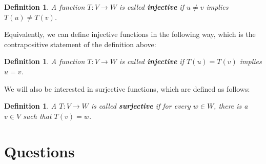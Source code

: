 \documentclass[12pt]{article}
\newtheorem{DEF}[thm]{Definition}
\begin{document}
\begin{DEF} A function $T: V \to W$ is called  \textbf{injective} if $u \neq v$ implies $T(u) \neq T(v)$. 
\end{DEF}

Equivalently, we can define injective functions in the following way, which is the contrapositive statement of the definition above:

\begin{DEF} A function $T: V \to W$ is called \textbf{injective} if $T(u) = T(v)$ implies $u=v$. 
\end{DEF}

We will also be interested in surjective functions, which are defined as follows:

\begin{DEF} A $T: V \to W$ is called \textbf{surjective} if for every $w \in W$, there is a $v\in V$ such that $T(v) = w$. 
\end{DEF}




\section{Questions}
\end{document}

